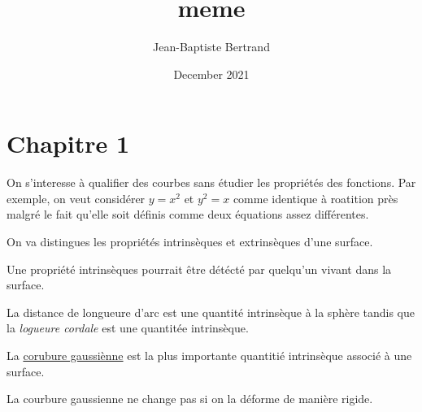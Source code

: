 \documentclass{article}
\title{meme}
\author{Jean-Baptiste Bertrand}
\date{December 2021}
\begin{document}
\section{Chapitre 1}

On s'interesse à qualifier des courbes sans étudier les propriétés des fonctions. Par exemple, on veut considérer $y=x^2$ et $y^2=x$ comme identique à roatition près malgré le fait qu'elle soit définis comme deux équations assez différentes.

On va distingues les propriétés intrinsèques et extrinsèques d'une surface.

Une propriété intrinsèques pourrait être détécté par quelqu'un vivant dans la surface.

La distance de longueure d'arc est une quantité intrinsèque à la sphère tandis que la \textit{logueure cordale} est une quantitée intrinsèque.

La \underline{corubure gaussiènne} est la plus importante quantitié intrinsèque associé à une surface.

La courbure gaussienne ne change pas si on la déforme de manière rigide.
\end{document}
